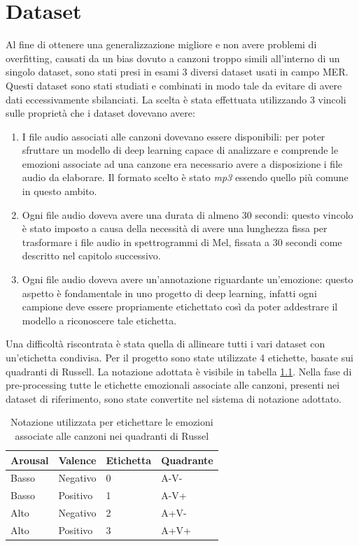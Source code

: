 \documentclass[11pt]{report}
\begin{document}
\chapter{Dataset}

Al fine di ottenere una generalizzazione migliore e non avere problemi di overfitting, causati da un bias dovuto a canzoni troppo simili all'interno di un singolo dataset, sono stati presi in esami 3 diversi dataset usati in campo MER. Questi dataset sono stati studiati e combinati in modo tale da evitare di avere dati eccessivamente sbilanciati. La scelta è stata effettuata utilizzando 3 vincoli sulle proprietà che i dataset dovevano avere:
\begin{enumerate}

    \item I file audio associati alle canzoni dovevano essere disponibili: per poter sfruttare un modello di deep learning capace di analizzare e comprende le emozioni associate ad una canzone era necessario avere a disposizione i file audio da elaborare. Il formato scelto è stato \textit{mp3} essendo quello più comune in questo ambito.
    
    \item Ogni file audio doveva avere una durata di almeno 30 secondi: questo vincolo è stato imposto a causa della necessità di avere una lunghezza fissa per trasformare i file audio in spettrogrammi di Mel, fissata a 30 secondi come descritto nel capitolo successivo.
    
    \item Ogni file audio doveva avere un'annotazione riguardante un'emozione: questo aspetto è fondamentale in uno progetto di deep learning, infatti ogni campione deve essere propriamente etichettato così da poter addestrare il modello a riconoscere tale etichetta.
    
\end{enumerate}



Una difficoltà riscontrata è stata quella di allineare tutti i vari dataset con un'etichetta condivisa. Per il progetto sono state utilizzate 4 etichette, basate sui quadranti di Russell. La notazione adottata è visibile in tabella \ref{tab1}. Nella fase di pre-processing tutte le etichette emozionali associate alle canzoni, presenti nei dataset di riferimento, sono state convertite nel sistema di notazione adottato.

\newpage

\begin{table}
\caption{Notazione utilizzata per etichettare le emozioni associate alle canzoni nei quadranti di Russel}
\label{tab1}
\centering
\begin{tabular}{|l|l|l|l|}
\hline
\textbf{Arousal} &  \textbf{Valence} & \textbf{Etichetta} & \textbf{Quadrante}\\
\hline
Basso &  Negativo & 0 & A-V-\\
Basso & Positivo & 1 & A-V+\\
Alto & Negativo & 2 & A+V-\\
Alto & Positivo & 3 & A+V+\\
\hline
\end{tabular}
\end{table}
\end{document}

